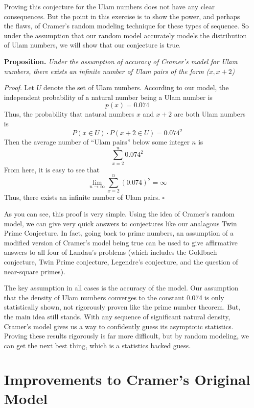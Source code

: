 \documentclass[conference]{IEEEtran}
\begin{document}
Proving this conjecture for the Ulam numbers does not have any clear consequences. But the point in this exercise is to show the power, and perhaps the flaws, of Cramer's random modeling technique for these types of sequence. So under the assumption that our random model accurately models the distribution of Ulam numbers, we will show that our conjecture is true.

\medskip\noindent
\textbf{Proposition.} \textit{Under the assumption of accuracy of Cramer's model for Ulam numbers, there exists an infinite number of Ulam pairs of the form ($x, x + 2$)} 

\smallskip\noindent
\textit{Proof.} Let $U$ denote the set of Ulam numbers. According to our model, the independent probability of a natural number being a Ulam number is
    \[p(x) = 0.074\]
Thus, the probability that natural numbers $x$ and $x + 2$ are both Ulam numbers is
    \[P(x \in U) \cdot P(x + 2 \in U) = 0.074^2\]
Then the average number of ``Ulam pairs'' below some integer $n$ is
\[\sum_{x = 2}^{n}0.074^2\]
From here, it is easy to see that
\[\lim_{n\rightarrow \infty} \sum_{x = 2}^{n}(0.074)^2 = \infty\]
Thus, there exists an infinite number of Ulam pairs.
\hfill$\square$\medskip

As you can see, this proof is very simple. Using the idea of Cramer's random model, we can give very quick answers to conjectures like our analagous Twin Prime Conjecture. In fact, going back to prime numbers, an assumption of a modified version of Cramer's model being true can be used to give affirmative answers to all four of Landau's problems \cite{b1} (which includes the Goldbach conjecture, Twin Prime conjecture, Legendre's conjecture, and the question of near-square primes).

The key assumption in all cases is the accuracy of the model. Our assumption that the density of Ulam numbers converges to the constant 0.074 is only statistically shown, not rigorously proven like the prime number theorem. But, the main idea still stands. With any sequence of significant natural density, Cramer's model gives us a way to confidently guess its asymptotic statistics. Proving these results rigorously is far more difficult, but by random modeling, we can get the next best thing, which is a statistics backed guess. 

\section{Improvements to Cramer's Original Model}
\end{document}
